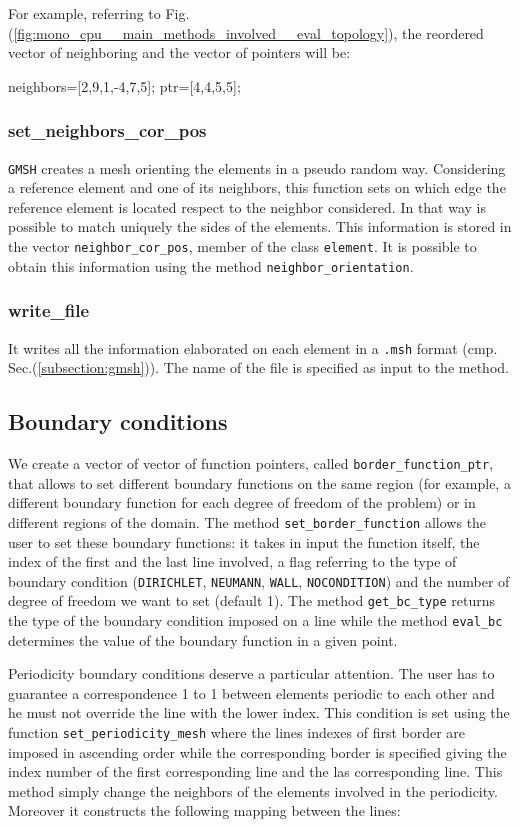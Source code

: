For example, referring to Fig.(\ref{fig:mono_cpu__main_methods_involved__eval_topology}), the reordered vector of neighboring and the vector of pointers will be:
\medskip

neighbors=[2,9,1,-4,7,5]; ptr=[4,4,5,5];

\subsubsection{set\_neighbors\_cor\_pos}
\verb|GMSH| creates a mesh orienting the elements in a pseudo random way. Considering a reference element and one of its neighbors, this function sets on which edge the reference element is located respect to the neighbor considered. In that way is possible to match uniquely the sides of the elements. This information is stored in the vector \verb|neighbor_cor_pos|, member of the class \verb|element|. It is possible to obtain this information using the method \verb|neighbor_orientation|.

\subsubsection{write\_file}
It writes all the information elaborated on each element in a \verb|.msh| format (cmp. Sec.(\ref{subsection:gmsh})). The name of the file is specified as input to the method.

\subsection{Boundary conditions}
We create a vector of vector of function pointers, called \verb|border_function_ptr|, that allows to set different boundary functions on the same region (for example, a different boundary function for each degree of freedom of the problem) or in different regions of the domain. The method \verb|set_border_function| allows the user to set these boundary functions: it takes in input the function itself, the index of the first and the last line involved, a flag referring to the type of boundary condition (\verb|DIRICHLET|, \verb|NEUMANN|, \verb|WALL|, \verb|NOCONDITION|) and the number of degree of freedom we want to set (default 1). The method \verb|get_bc_type| returns the type of the boundary condition imposed on a line while the method \verb|eval_bc| determines the value of the boundary function in a given point.

Periodicity boundary conditions deserve a particular attention. The user has to guarantee a correspondence 1 to 1 between elements periodic to each other and he must not override the line with the lower index. This condition is set using the function \verb|set_periodicity_mesh| where the lines indexes of first border are imposed in ascending order while the corresponding border is specified giving the index number of the first corresponding line and the las corresponding line. This method simply change the neighbors of the elements involved in the periodicity. Moreover it constructs the following mapping between the lines:

